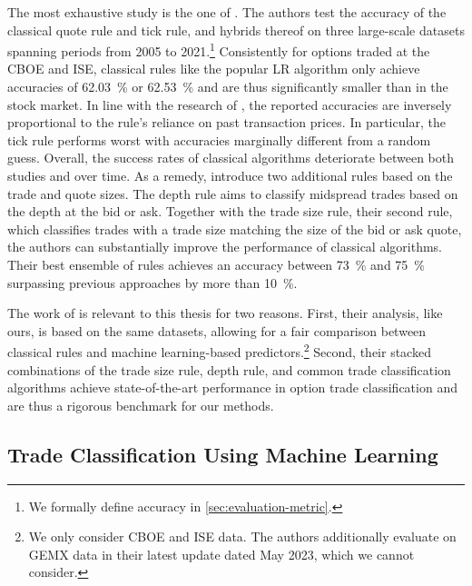 The most exhaustive study is the one of \textcite[\checkmark][1--53]{grauerOptionTradeClassification2022}. The authors test the accuracy of the classical quote rule and tick rule, and hybrids thereof on three large-scale datasets spanning periods from 2005 to 2021.\footnote{We formally define accuracy in \cref{sec:evaluation-metric}.} Consistently for options traded at the \gls{CBOE} and \gls{ISE}, classical rules like the popular \gls{LR}  algorithm only achieve accuracies of \SI{62.03}{\percent} or \SI{62.53}{\percent} and are thus significantly smaller than in the stock market. In line with the research of \textcite[\checkmark][886]{savickasInferringDirectionOption2003}, the reported accuracies are inversely proportional to the rule's reliance on past transaction prices. In particular, the tick rule performs worst with accuracies marginally different from a random guess. Overall, the success rates of classical algorithms deteriorate between both studies and over time. As a remedy, \textcite[][13--15]{grauerOptionTradeClassification2022} introduce two additional rules based on the trade and quote sizes. The depth rule aims to classify midspread trades based on the depth at the bid or ask. Together with the trade size rule, their second rule, which classifies trades with a trade size matching the size of the bid or ask quote, the authors can substantially improve the performance of classical algorithms. Their best ensemble of rules achieves an accuracy between \SI{73}{\percent} and \SI{75}{\percent} surpassing previous approaches by more than \SI{10}{\percent}.

The work of \textcite[\checkmark][1--53]{grauerOptionTradeClassification2022} is relevant to this thesis for two reasons. First, their analysis, like ours, is based on the same datasets, allowing for a fair comparison between classical rules and machine learning-based predictors.\footnote{We only consider \gls{CBOE} and \gls{ISE} data. The authors additionally evaluate on GEMX data in their latest update dated May 2023, which we cannot consider.} Second, their stacked combinations of the trade size rule, depth rule, and common trade classification algorithms achieve state-of-the-art performance in option trade classification and are thus a rigorous benchmark for our methods.

\subsection{Trade Classification Using Machine Learning}
\label{sec:trade-classification-using-machine-learning}

